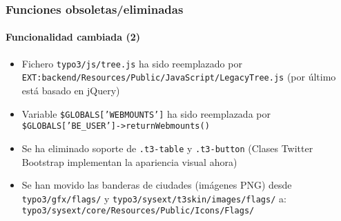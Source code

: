 \begin{frame}[fragile]
	\frametitle{Funciones obsoletas/eliminadas}
	\framesubtitle{Funcionalidad cambiada (2)}

	\begin{itemize}

		\item Fichero
			\small\texttt{typo3/js/tree.js}\normalsize\space
			ha sido reemplazado por
			\small\texttt{EXT:backend/Resources/Public/JavaScript/LegacyTree.js}\normalsize\newline
			(por último está basado en jQuery)

		\item Variable
			\small\texttt{\$GLOBALS['WEBMOUNTS']}\normalsize\space
			ha sido reemplazada por
			\small\texttt{\$GLOBALS['BE\_USER']->returnWebmounts()}\normalsize

		\item Se ha eliminado soporte de
			\small\texttt{.t3-table}\normalsize\space
			y
			\small\texttt{.t3-button}\normalsize\space
			\newline
			\small
				(Clases Twitter Bootstrap implementan la apariencia visual ahora)
			\normalsize

		\item Se han movido las banderas de ciudades (imágenes PNG) desde
			\small\texttt{typo3/gfx/flags/}\normalsize
			y
			\small\texttt{typo3/sysext/t3skin/images/flags/}\normalsize\newline
			a: \small\texttt{typo3/sysext/core/Resources/Public/Icons/Flags/}\normalsize

	\end{itemize}

\end{frame}


